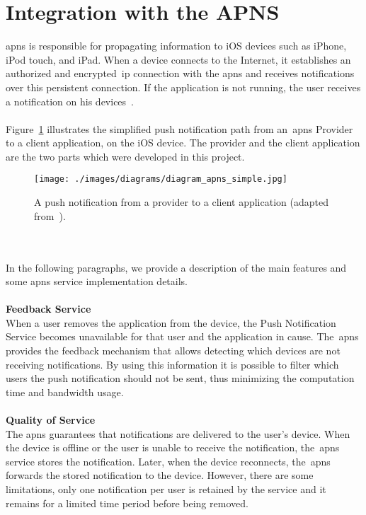 \section{Integration with the APNS}
\label{sec:APNSIntegration}
\gls{apns} is responsible for propagating information to iOS devices such as iPhone, iPod touch, and iPad. When a device connects to the Internet, it establishes an authorized and encrypted~\gls{ip} connection with the \gls{apns} and receives notifications over this persistent connection. If the application is not running, the user receives a notification on his devices~\cite{apns}.\\
\\
Figure~\ref{fig:apnsSimple} illustrates the simplified push notification path from an~\gls{apns} Provider to a client application, on the iOS device. The provider and the client application are the two parts which were developed in this project.\\
\begin{figure}[h!]
 \centering
   \texttt{[image: ./images/diagrams/diagram\_apns\_simple.jpg]}
   \caption{A push notification from a provider to a client application (adapted from~\cite{apns}).}
   \label{fig:apnsSimple}
\end{figure}\\
\\
In the following paragraphs, we provide a description of the main features and some \gls{apns} service implementation details.\\
\\
\textbf{Feedback Service}\\
When a user removes the application from the device, the Push Notification Service becomes unavailable for that user and the application in cause. The~\gls{apns} provides the feedback mechanism that allows detecting which devices are not receiving notifications. By using this information it is possible to filter which users the push notification should not be sent, thus minimizing the computation time and bandwidth usage.\\
\\
\textbf{Quality of Service}\\
The \gls{apns} guarantees that notifications are delivered to the user's device. When the device is offline or the user is unable to receive the notification, the~\gls{apns} service stores the notification. Later, when the device reconnects, the~\gls{apns} forwards the stored notification to the device. However, there are some limitations, only one notification per user is retained by the service and it remains for a limited time period before being removed.\\

